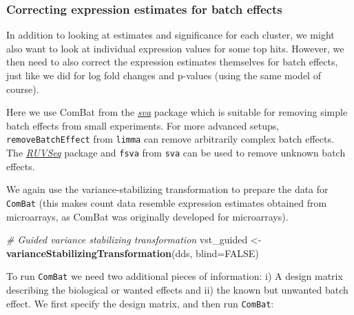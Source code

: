 \documentclass[9pt,a4paper,]{extarticle}
\newenvironment{Shaded}{\begin{snugshade}}{\end{snugshade}}
\newcommand{\KeywordTok}[1]{\textcolor[rgb]{0.13,0.29,0.53}{\textbf{{#1}}}}
\newcommand{\DataTypeTok}[1]{\textcolor[rgb]{0.13,0.29,0.53}{{#1}}}
\newcommand{\StringTok}[1]{\textcolor[rgb]{0.31,0.60,0.02}{{#1}}}
\newcommand{\CommentTok}[1]{\textcolor[rgb]{0.56,0.35,0.01}{\textit{{#1}}}}
\newcommand{\OtherTok}[1]{\textcolor[rgb]{0.56,0.35,0.01}{{#1}}}
\newcommand{\NormalTok}[1]{{#1}}
\begin{document}
\subsubsection{Correcting expression estimates for batch effects}\label{correcting-expression-estimates-for-batch-effects}

In addition to looking at estimates and significance for each cluster, we might also want to look at individual expression values for some top hits. However, we then need to also correct the expression estimates themselves for batch effects, just like we did for log fold changes and p-values (using the same model of course).

Here we use ComBat\citep{Johnson2007} from the \emph{\href{https://bioconductor.org/packages/3.8/sva}{sva}} package which is suitable for removing simple batch effects from small experiments. For more advanced setups, \texttt{removeBatchEffect} from \texttt{limma} can remove arbitrarily complex batch effects. The \emph{\href{https://bioconductor.org/packages/3.8/RUVSeq}{RUVSeq}} package and \texttt{fsva} from \texttt{sva} can be used to remove unknown batch effects.

We again use the variance-stabilizing transformation to prepare the data for \texttt{ComBat} (this makes count data resemble expression estimates obtained from microarrays, as ComBat was originally developed for microarrays).

\begin{Shaded}
\begin{Highlighting}[]
\CommentTok{# Guided variance stabilizing transformation}
\NormalTok{vst_guided <-}\StringTok{ }\KeywordTok{varianceStabilizingTransformation}\NormalTok{(dds, }\DataTypeTok{blind=}\OtherTok{FALSE}\NormalTok{)}
\end{Highlighting}
\end{Shaded}

To run \texttt{ComBat} we need two additional pieces of information: i) A design matrix describing the biological or wanted effects and ii) the known but unwanted batch effect. We first specify the design matrix, and then run \texttt{ComBat}:

\begin{Shaded}
\end{Shaded}
\end{document}

